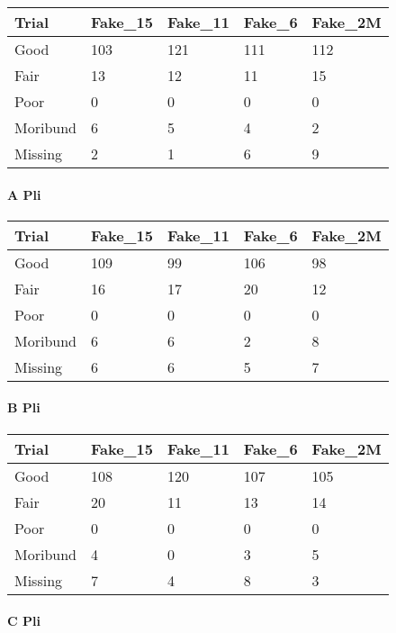 \documentclass[
]{article}
\begin{document}
\begin{tabular}{l|l|l|l|l}
\hline
Trial & Fake\_15 & Fake\_11 & Fake\_6 & Fake\_2M\\
\hline
Good & 103 & 121 & 111 & 112\\
\hline
Fair & 13 & 12 & 11 & 15\\
\hline
Poor & 0 & 0 & 0 & 0\\
\hline
Moribund & 6 & 5 & 4 & 2\\
\hline
Missing & 2 & 1 & 6 & 9\\
\hline
\end{tabular}

\hypertarget{a-pli}{%
\paragraph{A Pli}\label{a-pli}}

\begin{tabular}{l|l|l|l|l}
\hline
Trial & Fake\_15 & Fake\_11 & Fake\_6 & Fake\_2M\\
\hline
Good & 109 & 99 & 106 & 98\\
\hline
Fair & 16 & 17 & 20 & 12\\
\hline
Poor & 0 & 0 & 0 & 0\\
\hline
Moribund & 6 & 6 & 2 & 8\\
\hline
Missing & 6 & 6 & 5 & 7\\
\hline
\end{tabular}

\hypertarget{b-pli}{%
\paragraph{B Pli}\label{b-pli}}

\begin{tabular}{l|l|l|l|l}
\hline
Trial & Fake\_15 & Fake\_11 & Fake\_6 & Fake\_2M\\
\hline
Good & 108 & 120 & 107 & 105\\
\hline
Fair & 20 & 11 & 13 & 14\\
\hline
Poor & 0 & 0 & 0 & 0\\
\hline
Moribund & 4 & 0 & 3 & 5\\
\hline
Missing & 7 & 4 & 8 & 3\\
\hline
\end{tabular}

\hypertarget{c-pli}{%
\paragraph{C Pli}\label{c-pli}}
\end{document}

